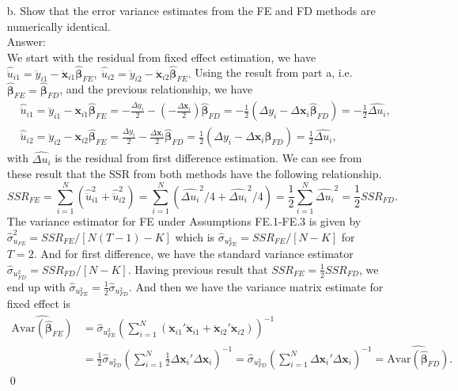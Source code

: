 \documentclass[10pt]{article}
\newcommand{\Av}{\text{Avar}}
\begin{document}
\begin{enumerate}
\item[b.] Show that the error variance estimates from the FE and FD methods are numerically identical.
\\ Answer: \\
We start with the residual from fixed effect estimation, we have $\hat{\ddot{u}}_{i1}=\ddot{y}_{i1}-\ddot{\textbf{x}}_{i1}\hat{\pmb{\beta}}_{FE},\ \hat{\ddot{u}}_{i2}=\ddot{y}_{i2}-\ddot{\textbf{x}}_{i2}\hat{\pmb{\beta}}_{FE}.$ Using the result from part a, i.e. $\hat{\pmb{\beta}}_{FE}=\hat{\pmb{\beta}}_{FD}$, and the previous relationship, we have
\begin{align*}
    &\hat{\ddot{u}}_{i1}=\ddot{y}_{i1}-\ddot{\textbf{x}}_{i1}\hat{\pmb{\beta}}_{FE}=-\frac{\Delta {y}_i}{2}-(-\frac{\Delta\textbf{x}_i}{2})\hat{\pmb{\beta}}_{FD}=-\frac{1}{2}(\Delta {y}_i-\Delta\textbf{x}_i\hat{\pmb{\beta}}_{FD})=-\frac{1}{2}\hat{\Delta u_i},\\
    &\hat{\ddot{u}}_{i2}=\ddot{y}_{i2}-\ddot{\textbf{x}}_{i2}\hat{\pmb{\beta}}_{FE}=\frac{\Delta {y}_i}{2}-\frac{\Delta\textbf{x}_i}{2}\hat{\pmb{\beta}}_{FD}=\frac{1}{2}(\Delta {y}_i-\Delta\textbf{x}_i\hat{\pmb{\beta}}_{FD})=\frac{1}{2}\hat{\Delta u_i},
\end{align*}
with $\hat{\Delta u_i}$ is the residual from first difference estimation. We can see from these result that the SSR from both methods have the following relationship.
\[SSR_{FE}=\sum_{i=1}^N(\hat{\ddot{u}}_{i1}^2+\hat{\ddot{u}}_{i2}^2)=\sum_{i=1}^N(\hat{\Delta u_i}^2/4+\hat{\Delta u_i}^2/4)=\frac{1}{2}\sum_{i=1}^N\hat{\Delta u_i}^2=\frac{1}{2}SSR_{FD}.\]
The variance estimator for FE under Assumptions FE.1-FE.3 is given by $\hat{\sigma}_{u_{FE}}^2=SSR_{FE}/[N(T-1)-K]$ which is $\hat{\sigma}_u_{FE}^2=SSR_{FE}/[N-K]$ for $T=2.$ And for first difference, we have the standard variance estimator $\hat{\sigma}_u_{FD}^2=SSR_{FD}/[N-K].$ Having previous result that $SSR_{FE}=\frac{1}{2}SSR_{FD}$, we end up with $\hat{\sigma}_u_{FE}^2=\frac{1}{2}\hat{\sigma}_u_{FD}^2.$ And then we have the variance matrix estimate for fixed effect is
\begin{align*}
    \hat{\Av(\hat{\pmb{\beta}}_{FE})}&=\hat{\sigma}_u_{FE}^2\left(\sum_{i=1}^N(\ddot{\textbf{x}}_{i1}'\ddot{\textbf{x}}_{i1}+\ddot{\textbf{x}}_{i2}'\ddot{\textbf{x}}_{i2})\right)^{-1}\\
    &=\frac{1}{2}\hat{\sigma}_u_{FD}^2\left(\sum_{i=1}^N\frac{1}{2}\Delta\textbf{x}_i'\Delta\textbf{x}_i\right)^{-1}=\hat{\sigma}_u_{FD}^2\left(\sum_{i=1}^N\Delta\textbf{x}_i'\Delta\textbf{x}_i\right)^{-1}=\hat{\Av(\hat{\pmb{\beta}}_{FD})}.
\end{align*}\qed
\end{enumerate}
\end{document}
